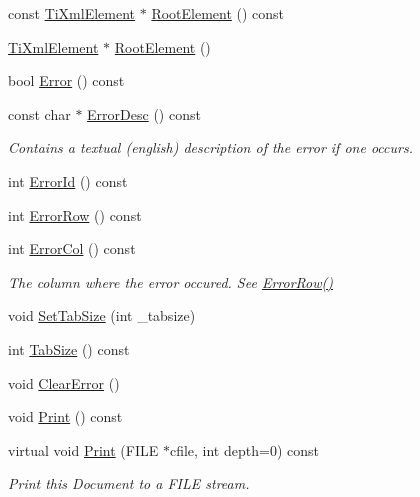 \begin{DoxyCompactItemize}
\item 
const \hyperlink{class_ti_xml_element}{Ti\-Xml\-Element} $\ast$ \hyperlink{class_ti_xml_document_ad09d17927f908f40efb406af2fb873be}{Root\-Element} () const 
\item 
\hyperlink{class_ti_xml_element}{Ti\-Xml\-Element} $\ast$ \hyperlink{class_ti_xml_document_a0b43e762a23f938b06651bc90b8a1013}{Root\-Element} ()
\item 
bool \hyperlink{class_ti_xml_document_a6dfc01a6e5d58e56acd537dfd3bdeb29}{Error} () const 
\item 
const char $\ast$ \hyperlink{class_ti_xml_document_a9d0f689f6e09ea494ea547be8d79c25e}{Error\-Desc} () const 
\begin{DoxyCompactList}\small\item\em Contains a textual (english) description of the error if one occurs. \end{DoxyCompactList}\item 
int \hyperlink{class_ti_xml_document_af96fc2f3f9ec6422782bfe916c9e778f}{Error\-Id} () const 
\item 
int \hyperlink{class_ti_xml_document_af30efc75e804aa2e92fb8be3a8cb676e}{Error\-Row} () const 
\item 
int \hyperlink{class_ti_xml_document_aa90bc630ee5203c6109ca5fad3323649}{Error\-Col} () const 
\begin{DoxyCompactList}\small\item\em The column where the error occured. See \hyperlink{class_ti_xml_document_af30efc75e804aa2e92fb8be3a8cb676e}{Error\-Row()} \end{DoxyCompactList}\item 
void \hyperlink{class_ti_xml_document_a51dac56316f89b35bdb7d0d433ba988e}{Set\-Tab\-Size} (int \-\_\-tabsize)
\item 
int \hyperlink{class_ti_xml_document_a612360241b85bad0826b2a9ae9cda561}{Tab\-Size} () const 
\item 
void \hyperlink{class_ti_xml_document_ac66b8c28db86363315712a3574e87c35}{Clear\-Error} ()
\item 
void \hyperlink{class_ti_xml_document_af08389ec70ee9b2de7f800e206a18510}{Print} () const 
\item 
virtual void \hyperlink{class_ti_xml_document_a7b1aea204fee266b70b9c105c8bf2ada}{Print} (F\-I\-L\-E $\ast$cfile, int depth=0) const 
\begin{DoxyCompactList}\small\item\em Print this Document to a F\-I\-L\-E stream. \end{DoxyCompactList}\item 

\end{DoxyCompactItemize}
